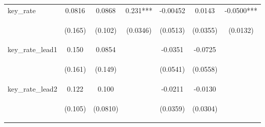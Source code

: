 \documentclass[]{article}
\begin{document}
\begin{center}
\begin{tabular}{lcccccc}
key\_rate & 0.0816 & 0.0868 & 0.231*** & -0.00452 & 0.0143 & -0.0500*** \\
\vspace{4pt} & \begin{footnotesize}(0.165)\end{footnotesize} & \begin{footnotesize}(0.102)\end{footnotesize} & \begin{footnotesize}(0.0346)\end{footnotesize} & \begin{footnotesize}(0.0513)\end{footnotesize} & \begin{footnotesize}(0.0355)\end{footnotesize} & \begin{footnotesize}(0.0132)\end{footnotesize} \\
key\_rate\_lead1 & 0.150 & 0.0854 &  & -0.0351 & -0.0725 &  \\
\vspace{4pt} & \begin{footnotesize}(0.161)\end{footnotesize} & \begin{footnotesize}(0.149)\end{footnotesize} & \begin{footnotesize}\end{footnotesize} & \begin{footnotesize}(0.0541)\end{footnotesize} & \begin{footnotesize}(0.0558)\end{footnotesize} & \begin{footnotesize}\end{footnotesize} \\
key\_rate\_lead2 & 0.122 & 0.100 &  & -0.0211 & -0.0130 &  \\
\vspace{4pt} & \begin{footnotesize}(0.105)\end{footnotesize} & \begin{footnotesize}(0.0810)\end{footnotesize} & \begin{footnotesize}\end{footnotesize} & \begin{footnotesize}(0.0359)\end{footnotesize} & \begin{footnotesize}(0.0304)\end{footnotesize} & \begin{footnotesize}\end{footnotesize} \\

\end{tabular}
\end{center}
\end{document}
